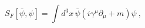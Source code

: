 \begin{equation}
S_{F}[\bar{\psi},\psi ]=\int d^{3}x\,\bar{\psi}\left( i\gamma ^{\mu
}\partial \!\!_{\mu }+m\right) \psi \ ,  \label{faction}
\end{equation}

